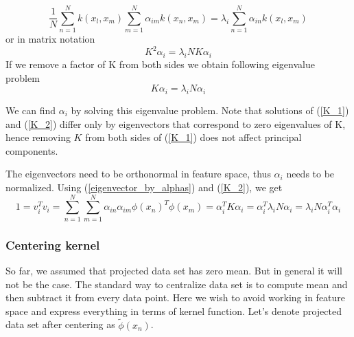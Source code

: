 \begin{equation}
\dfrac{1}{N}\sum_{n=1}^{N}{k(x_l, x_m)} \sum_{m=1}^{N}{\alpha_{im}k(x_n, x_m)} = \lambda_i \sum_{n=1}^{N}{\alpha_{in}k(x_l, x_m)}
\end{equation}
or in matrix notation
\begin{equation}\label{K_1}
K^2\alpha_i = \lambda_iNK\alpha_i
\end{equation}
If we remove a factor of K from both sides we obtain following eigenvalue problem
\begin{equation}\label{K_2}
K\alpha_i = \lambda_iN\alpha_i
\end{equation}

We can find $\alpha_i$ by solving this eigenvalue problem. Note that solutions of (\ref{K_1}) and (\ref{K_2}) differ only by eigenvectors that correspond to zero eigenvalues of K, hence removing $K$ from both sides of (\ref{K_1}) does not affect principal components.  

The eigenvectors need to be orthonormal  in feature space, thus $\alpha_i$ needs to be normalized. Using (\ref{eigenvector_by_alphas}) and (\ref{K_2}), we get
\begin{equation}
1 = v_i^Tv_i = \sum_{n=1}^{N}\sum_{m=1}^{N}{\alpha_{in}\alpha_{im}\phi(x_n)^T\phi(x_m)} = \alpha_i^TK\alpha_i = \alpha_i^T\lambda_iN\alpha_i = \lambda_iN\alpha_i^T\alpha_i
\end{equation}

\subsubsection{Centering kernel}
So far, we assumed that projected data set has zero mean. But in general it will not be the case. The standard way to centralize data set is to compute mean and then subtract it from every data point.
Here we wish to avoid working in feature space and express everything in terms of kernel function. Let's denote projected data set after centering as $\widetilde{\phi}(x_n)$.

